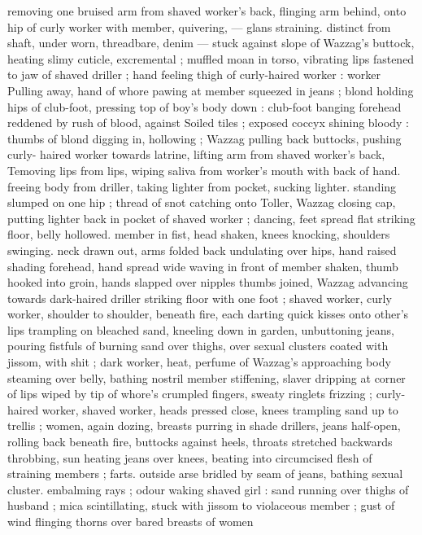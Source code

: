 removing one bruised arm from shaved worker's back, flinging arm 
behind, onto hip of curly worker with member, quivering, --- glans 
straining. distinct from shaft, under worn, threadbare, denim --- 
stuck against slope of Wazzag's buttock, heating slimy cuticle, 
excremental ; muffled moan in torso, vibrating lips fastened to jaw of 
shaved driller ; hand feeling thigh of curly-haired worker : worker 
Pulling away, hand of whore pawing at member squeezed in jeans ; 
blond holding hips of club-foot, pressing top of boy's body down : 
club-foot banging forehead reddened by rush of blood, against 
Soiled tiles ; exposed coccyx shining bloody : thumbs of blond 
digging in, hollowing ; Wazzag pulling back buttocks, pushing curly- 
haired worker towards latrine, lifting arm from shaved worker's back, 
Temoving lips from lips, wiping saliva from worker's mouth with back 
of hand. freeing body from driller, taking lighter from pocket, sucking 
lighter. standing slumped on one hip ; thread of snot catching onto 
Toller, Wazzag closing cap, putting lighter back in pocket of shaved 
worker ; dancing, feet spread flat striking floor, belly hollowed. 
member in fist, head shaken, knees knocking, shoulders swinging. 
neck drawn out, arms folded back undulating over hips, hand raised 
shading forehead, hand spread wide waving in front of member 
shaken, thumb hooked into groin, hands slapped over nipples 
thumbs joined, Wazzag advancing towards dark-haired driller striking 
floor with one foot ; shaved worker, curly worker, shoulder to 
shoulder, beneath fire, each darting quick kisses onto other's lips 
trampling on bleached sand, kneeling down in garden, unbuttoning 
jeans, pouring fistfuls of burning sand over thighs, over sexual 
clusters coated with jissom, with shit ; dark worker, heat, perfume of 
Wazzag's approaching body steaming over belly, bathing nostril 
member stiffening, slaver dripping at corner of lips wiped by tip of 
whore's crumpled fingers, sweaty ringlets frizzing ; curly-haired 
worker, shaved worker, heads pressed close, knees trampling sand 
up to trellis ; women, again dozing, breasts purring in shade 
drillers, jeans half-open, rolling back beneath fire, buttocks against 
heels, throats stretched backwards throbbing, sun heating jeans over 
knees, beating into circumcised flesh of straining members ; farts. 
outside arse bridled by seam of jeans, bathing sexual cluster. 
embalming rays ; odour waking shaved girl : sand running over 
thighs of husband ; mica scintillating, stuck with jissom to violaceous 
member ; gust of wind flinging thorns over bared breasts of women 
